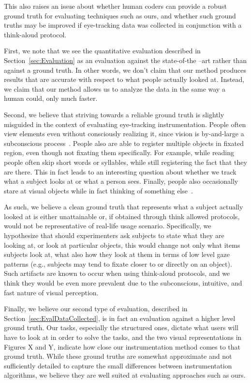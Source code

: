 This also raises an issue about whether human coders can provide a robust ground truth for evaluating techniques such as ours, and whether such ground truths may be improved if eye-tracking data was collected in conjunction with a think-aloud protocol. 


First, we note that we see the quantitative evaluation described in Section~\ref{sec:Evaluation} as an evaluation against the state-of-the –art rather than against a ground truth. In other words, we don't claim that our method produces results that are accurate with respect to what people actually looked at. Instead, we claim that our method allows us to analyze the data in the same way a human could, only much faster. 

Second, we believe that striving towards a reliable ground truth is slightly misguided in the context of evaluating eye-tracking instrumentation.  People often view elements even without consciously realizing it, since vision is by-and-large a subconscious process~\cite{duchowski2007eye}. People also are able to register multiple objects in fixated region, even though not fixating them specifically. For example, while reading people often skip short words or syllables, while still registering the fact that they are there. This in fact leads to an interesting question about whether we track what a subject looks at or what a person sees. Finally, people also occasionally stare at visual objects while in fact thinking of something else~\cite{duchowski2007eye}. 


As such, we believe a clean ground truth that represents what a subject actually looked at is either unattainable or, if obtained through think allowed protocols, would not be representative of real-life usage scenario. Specifically, we hypothesize that should experimenters ask subjects to state what they are looking at, or look at particular objects, this would change not only what items subjects look at, what also how they look at them in terms of low level gaze patterns (e.g., subjects may tend to fixate closer to or directly on an object). Such artifacts are known to occur when using think-aloud protocols, and we think they would be even more prevalent due to the subconscious, intuitive, and fast nature of visual perception.   

Finally, we believe our second type of evaluation, described in Section~\ref{sec:EvalDataCollected}, is in fact an evaluation against a higher level ground truth. Our tasks, especially the structured ones, dictate what users will have to look at in order to solve the tasks, and the two visual representations in Figures X and Y, indicate how close our instrumentation method comes to that ground truth. While these ground truths are somewhat approximate and not sufficiently detailed to capture the small differences between instrumentation algorithms, we believe they are well suited at evaluating approaches such as ours.   
